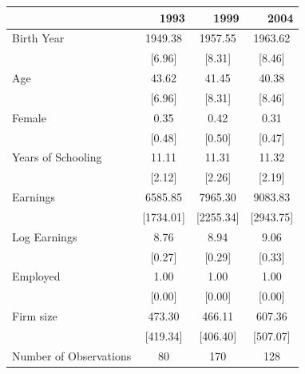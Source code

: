 \documentclass{article}
\begin{document}
\begin{table}[htbp]
\begin{threeparttable}
\centering
\begin{tabular}{llll}
\toprule
\multicolumn{1}{c}{} &
  \multicolumn{1}{r}{1993} &
  \multicolumn{1}{r}{1999} &
  \multicolumn{1}{r}{2004} \\
\midrule
\multicolumn{1}{l}{Birth Year} &
  \multicolumn{1}{c}{1949.38} &
  \multicolumn{1}{c}{1957.55} &
  \multicolumn{1}{c}{1963.62} \\
\multicolumn{1}{l}{} &
  \multicolumn{1}{c}{[6.96]} &
  \multicolumn{1}{c}{[8.31]} &
  \multicolumn{1}{c}{[8.46]} \\
\multicolumn{1}{l}{Age} &
  \multicolumn{1}{c}{43.62} &
  \multicolumn{1}{c}{41.45} &
  \multicolumn{1}{c}{40.38} \\
\multicolumn{1}{l}{} &
  \multicolumn{1}{c}{[6.96]} &
  \multicolumn{1}{c}{[8.31]} &
  \multicolumn{1}{c}{[8.46]} \\
\multicolumn{1}{l}{Female} &
  \multicolumn{1}{c}{0.35} &
  \multicolumn{1}{c}{0.42} &
  \multicolumn{1}{c}{0.31} \\
\multicolumn{1}{l}{} &
  \multicolumn{1}{c}{[0.48]} &
  \multicolumn{1}{c}{[0.50]} &
  \multicolumn{1}{c}{[0.47]} \\
\multicolumn{1}{l}{Years of Schooling} &
  \multicolumn{1}{c}{11.11} &
  \multicolumn{1}{c}{11.31} &
  \multicolumn{1}{c}{11.32} \\
\multicolumn{1}{l}{} &
  \multicolumn{1}{c}{[2.12]} &
  \multicolumn{1}{c}{[2.26]} &
  \multicolumn{1}{c}{[2.19]} \\
\multicolumn{1}{l}{Earnings} &
  \multicolumn{1}{c}{6585.85} &
  \multicolumn{1}{c}{7965.30} &
  \multicolumn{1}{c}{9083.83} \\
\multicolumn{1}{l}{} &
  \multicolumn{1}{c}{[1734.01]} &
  \multicolumn{1}{c}{[2255.34]} &
  \multicolumn{1}{c}{[2943.75]} \\
\multicolumn{1}{l}{Log Earnings} &
  \multicolumn{1}{c}{8.76} &
  \multicolumn{1}{c}{8.94} &
  \multicolumn{1}{c}{9.06} \\
\multicolumn{1}{l}{} &
  \multicolumn{1}{c}{[0.27]} &
  \multicolumn{1}{c}{[0.29]} &
  \multicolumn{1}{c}{[0.33]} \\
\multicolumn{1}{l}{Employed} &
  \multicolumn{1}{c}{1.00} &
  \multicolumn{1}{c}{1.00} &
  \multicolumn{1}{c}{1.00} \\
\multicolumn{1}{l}{} &
  \multicolumn{1}{c}{[0.00]} &
  \multicolumn{1}{c}{[0.00]} &
  \multicolumn{1}{c}{[0.00]} \\
\multicolumn{1}{l}{Firm size} &
  \multicolumn{1}{c}{473.30} &
  \multicolumn{1}{c}{466.11} &
  \multicolumn{1}{c}{607.36} \\
\multicolumn{1}{l}{} &
  \multicolumn{1}{c}{[419.34]} &
  \multicolumn{1}{c}{[406.40]} &
  \multicolumn{1}{c}{[507.07]} \\
\midrule
\multicolumn{1}{l}{Number of Observations} &
  \multicolumn{1}{c}{80} &
  \multicolumn{1}{c}{170} &
  \multicolumn{1}{c}{128} \\
\bottomrule
\end{tabular}

\end{threeparttable} 
\end{table}
\end{document}
